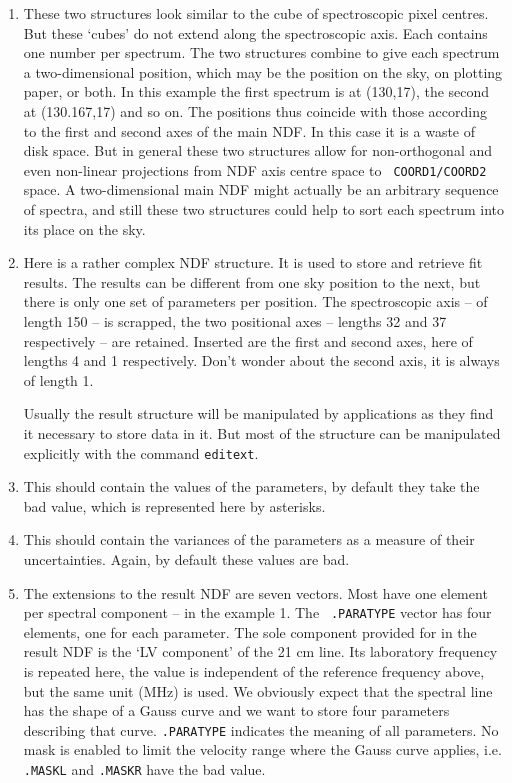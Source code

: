 \documentclass[11pt,twoside]{article}
\newcommand{\htmlref}[2]{#1}
\begin{document}
\begin{enumerate}
\item These two structures look similar to the cube of spectroscopic
   pixel centres. But these `cubes' do not extend along the
   spectroscopic axis. Each contains one number per spectrum. The two
   structures combine to give each spectrum a two-dimensional position,
   which may be the position on the sky, on plotting paper, or both. In this
   example the first spectrum is at (130,17), the second at (130.167,17) and
   so on.  The positions thus coincide with those according to the first and
   second axes of the main NDF. In this case it is a waste of disk
   space. But in general these two structures allow for non-orthogonal
   and even non-linear projections from NDF axis centre space to {\tt
   COORD1/COORD2} space. A two-dimensional main NDF might actually be an
   arbitrary sequence of spectra, and still these two structures could
   help to sort each spectrum into its place on the sky.

\item Here is a rather complex NDF structure. It is used to store and
   retrieve fit results. The results can be different from one sky
   position to the next, but there is only one set of parameters per
   position. The spectroscopic axis -- of length 150 -- is scrapped, the
   two positional axes -- lengths 32 and 37 respectively -- are
   retained. Inserted are the first and second axes, here of lengths 4
   and 1 respectively. Don't wonder about the second axis, it is always
   of length 1.

   Usually the result structure will be manipulated by applications as
   they find it necessary to store data in it. But most of the structure
   can be manipulated explicitly with the command
{\tt\htmlref{editext}{EDITEXT}}.

\item This should contain the values of the parameters, by default they
   take the bad value, which is represented here by asterisks.

\item This should contain the variances of the parameters as a measure
   of their uncertainties. Again, by default these values are bad.

\item The extensions to the result NDF are seven vectors. Most have one
   element per spectral component -- in the example 1. The {\tt
   .PARATYPE} vector has four elements, one for each parameter. The sole
   component provided for in the result NDF is the `LV component' of
   the 21 cm line. Its laboratory frequency is repeated here, the value
   is independent of the reference frequency above, but the same unit
   (MHz) is used. We obviously expect that the spectral line has the
   shape of a Gauss curve and we want to store four parameters
   describing that curve. {\tt .PARATYPE} indicates the meaning of all
   parameters. No mask is enabled to limit the velocity range where the
   Gauss curve applies, i.e. {\tt .MASKL} and {\tt .MASKR} have the bad
   value.


\end{enumerate}
\end{document}
